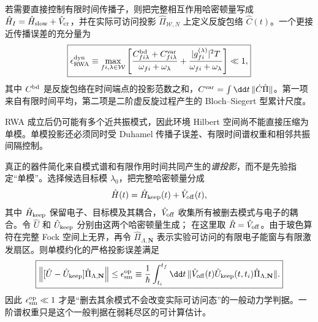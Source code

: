 若需要直接控制有限时间传播子，则把完整相互作用哈密顿量写成 $\hat H_I=\hat H_{\rm slow}+\hat V_{\rm cr}$，并在实际可访问投影 $\hat\Pi_{\mathcal W,N}$ 上定义反旋包络 $\hat C(t)$。一个更接近传播误差的充分量为
\begin{equation}
\boxed{
\epsilon_{\rm RWA}^{\rm dyn}
\equiv\max_{fi,\lambda\in\mathcal W}
\left[
\frac{C_{fi\lambda}^{\rm bd}+C_{fi\lambda}^{\rm var}}{\omega_{fi}+\omega_\lambda}
+\frac{|g_{fi}^{(\lambda)}|^2T}{\omega_{fi}+\omega_\lambda}
\right]\ll1,}
\label{eq:rwa_projected_dynamical_error}
\end{equation}
其中 $C^{\rm bd}$ 是反旋包络在时间端点的投影范数之和，$C^{\rm var}=\int\dd t\,\|\dot C\hat\Pi\|$。第一项来自有限时间平均，第二项是二阶虚反旋过程产生的 Bloch--Siegert 型累计尺度。

RWA 成立后仍可能有多个近共振模式，因此环境 Hilbert 空间尚不能直接压缩为单模。单模投影还必须同时受 Duhamel 传播子误差、有限时间谱权重和相邻共振间隔控制。

真正的器件简化来自模式谱和有限作用时间共同产生的\emph{谱投影}，而不是先验指定“单模”。选择候选目标模 $\lambda_0$，把完整哈密顿量分成
\[
\hat H(t)=\hat H_{\rm keep}(t)+\hat V_{\rm off}(t),
\]
其中 $\hat H_{\rm keep}$ 保留电子、目标模及其耦合，$\hat V_{\rm off}$ 收集所有被删去模式与电子的耦合。令 $\hat U$ 和 $\hat U_{\rm keep}$ 分别由这两个哈密顿量生成； 在这里取 $\hat R=\hat V_{\rm off}$。由于玻色算符在完整 Fock 空间上无界，再令 $\hat\Pi_{\Lambda,\mathbf N}$ 表示实验可访问的有限电子能窗与有限激发扇区。则单模约化的严格投影误差满足
\begin{equation}
\boxed{
\left\|
[\hat U-\hat U_{\rm keep}]
\hat\Pi_{\Lambda,\mathbf N}
\right\|
\le
\epsilon_{\rm sm}^{\rm op}
\equiv
\frac1\hbar
\int_{t_i}^{t_f}\dd t\,
\|
\hat V_{\rm off}(t)
\hat U_{\rm keep}(t,t_i)
\hat\Pi_{\Lambda,\mathbf N}
\|.}
\label{eq:single_mode_duhamel_error_bound}
\end{equation}
因此 $\epsilon_{\rm sm}^{\rm op}\ll1$ 才是“删去其余模式不会改变实际可访问态”的一般动力学判据。一阶谱权重只是这个一般判据在弱耗尽区的可计算估计。

